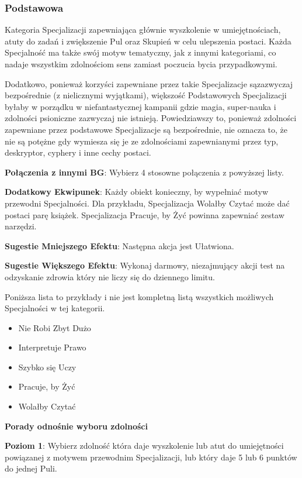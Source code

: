 \subsubsection{Podstawowa}

Kategoria Specjalizacji zapewniająca głównie wyszkolenie w umiejętnościach, atuty do zadań i zwiększenie Pul oraz Skupień w celu ulepszenia postaci. Każda Specjalność ma także swój motyw tematyczny, jak z innymi kategoriami, co nadaje wszystkim zdolnościom sens zamiast poczucia bycia przypadkowymi.

Dodatkowo, ponieważ korzyści zapewniane przez takie Specjalizacje sązazwyczaj bezpośrednie (z nielicznymi wyjątkami), większość Podstawowych Specjalizacji byłaby w porządku w niefantastycznej kampanii gdzie magia, super-nauka i zdolności psioniczne zazwyczaj nie istnieją. Powiedziawszy to, ponieważ zdolności zapewniane przez podstawowe Specjalizacje są bezpośrednie, nie oznacza to, że nie są potężne gdy wymiesza się je ze zdolnościami zapewnianymi przez typ, deskryptor, cyphery i inne cechy postaci.

\textbf{Połączenia z innymi BG}: Wybierz 4 stosowne połączenia z powyższej listy.

\textbf{Dodatkowy Ekwipunek}: Każdy obiekt konieczny, by wypełniać motyw przewodni Specjalności. Dla przykładu, Specjalizacja Wolałby Czytać może dać postaci parę książek. Specjalizacja Pracuje, by Żyć powinna zapewniać zestaw narzędzi.

\textbf{Sugestie Mniejszego Efektu}: Następna akcja jest Ułatwiona.

\textbf{Sugestie Większego Efektu}: Wykonaj darmowy, niezajmujący akcji test na odzyskanie zdrowia który nie liczy się do dziennego limitu.

Poniższa lista to przykłady i nie jest kompletną listą wszystkich możliwych Specjalności w tej kategorii.

\begin{itemize}
\item Nie Robi Zbyt Dużo
\item Interpretuje Prawo
\item Szybko się Uczy
\item Pracuje, by Żyć
\item Wolałby Czytać
\end{itemize}

\textbf{Porady odnośnie wyboru zdolności}

\textbf{Poziom 1}: Wybierz zdolność która daje wyszkolenie lub atut do umiejętności powiązanej z motywem przewodnim Specjalizacji, lub który daje 5 lub 6 punktów do jednej Puli.

